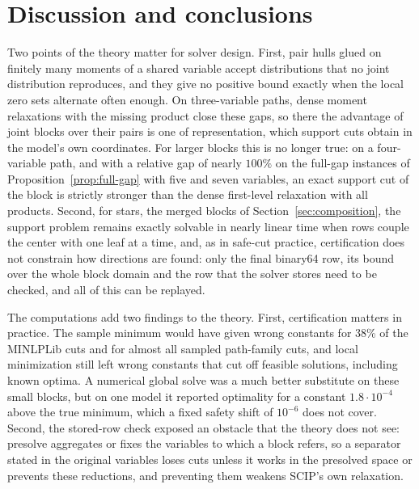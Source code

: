 \section{Discussion and conclusions}\label{sec:conclusions}

Two points of the theory matter for solver design. First, pair hulls glued on
finitely many moments of a shared variable accept distributions that no joint
distribution reproduces, and they give no positive bound exactly when the
local zero sets alternate often enough. On three-variable paths, dense moment
relaxations with the missing product close these gaps, so there the advantage
of joint blocks over their pairs is one of representation, which support cuts
obtain in the model's own coordinates. For larger blocks this is no longer
true: on a four-variable path, and with a relative gap of
nearly $100\%$ on the full-gap instances of Proposition~\ref{prop:full-gap}
with five and seven variables, an exact support cut of the block is strictly
stronger than the dense first-level relaxation with all products. Second, for stars, the merged blocks of
Section~\ref{sec:composition}, the support problem remains exactly solvable in
nearly linear time when rows couple the center with one leaf at a time, and,
as in safe-cut practice, certification does not constrain how directions are
found: only the final binary64 row, its bound over the whole block domain and
the row that the solver stores need to be checked, and all of this can be
replayed.

The computations add two findings to the theory. First, certification matters
in practice. The sample minimum would have given wrong constants for 38\% of
the MINLPLib cuts and for almost all sampled path-family cuts, and local
minimization still left wrong constants that cut off feasible solutions,
including known optima. A numerical global solve was a much better substitute
on these small blocks, but on one model it reported optimality for a constant
$1.8\cdot10^{-4}$ above the true minimum, which a fixed safety shift of
$10^{-6}$ does not cover. Second, the stored-row check exposed an obstacle that
the theory does not see: presolve aggregates or fixes the variables to which a
block refers, so a separator stated in the original variables loses cuts unless
it works in the presolved space or prevents these reductions, and preventing
them weakens SCIP's own relaxation.

